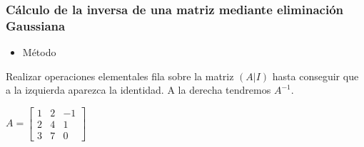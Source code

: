 \subsubsection{Cálculo de la inversa de una matriz mediante eliminación Gaussiana}
\begin{itemize}[label=\color{red}\textbullet, leftmargin=*]
	\item \color{lightblue}Método
\end{itemize}
Realizar operaciones elementales fila sobre la matriz $(A|I)$ hasta conseguir que a la izquierda aparezca la identidad. A la derecha tendremos $A^{-1}$.

\Ej

$A=\begin{bmatrix}
	1 & 2 & -1 \\
	2 & 4 & 1 \\
	3 & 7 & 0
\end{bmatrix}$

